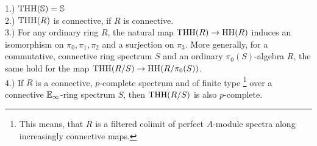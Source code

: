 \begin{lem}  \label{PropertiesTHH}
    1.) $\operatorname{THH}(\mathbb{S})=\mathbb{S}$ \\
    2.) $\operatorname{THH}(R)$ is connective, if $R$ is connective.\\
    3.) For any ordinary ring $R$, the natural map $\operatorname{THH}(R)\to \operatorname{HH}(R)$ induces an isomorphism on $\pi_0,\pi_1,\pi_2$ and a surjection on $\pi_3$. More generally, for a commutative, connective ring spectrum $S$ and an ordinary $\pi_0(S)$-algebra $R$, the same hold for the map $\operatorname{THH}(R/S)\to \operatorname{HH}(R/\pi_0(S))$. \\
    4.) If $R$ is a connective, $p$-complete spectrum and of finite type \footnote{This means, that $R$ is a filtered colimit of perfect $A$-module spectra along increasingly connective maps.} over a connective $\mathbb{E}_\infty$-ring spectrum $S$, then $\operatorname{THH}(R/S)$ is also $p$-complete.\\   
\end{lem}

